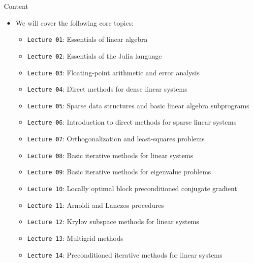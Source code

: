\documentclass[t,usepdftitle=false]{beamer}
\begin{document}
\begin{frame}{Content}
\begin{itemize}
\vspace{-.1cm}
\item We will cover the following core topics:%
\begin{itemize}
\item[-] \texttt{Lecture 01}: Essentials of linear algebra\vspace{.02cm}
\item[-] \texttt{Lecture 02}: Essentials of the Julia language\vspace{.02cm}
\item[-] \texttt{Lecture 03}: Floating-point arithmetic and error analysis\vspace{.02cm}
\item[-] \texttt{Lecture 04}: Direct methods for dense linear systems\vspace{.02cm}
\item[-] \texttt{Lecture 05}: Sparse data structures and basic linear algebra subprograms\vspace{.02cm}
\item[-] \texttt{Lecture 06}: Introduction to direct methods for sparse linear systems\vspace{.02cm}
\item[-] \texttt{Lecture 07}: Orthogonalization and least-squares problems\vspace{.02cm}
\item[-] \texttt{Lecture 08}: Basic iterative methods for linear systems\vspace{.02cm}
\item[-] \texttt{Lecture 09}: Basic iterative methods for eigenvalue problems\vspace{.02cm}
\item[-] \texttt{Lecture 10}: Locally optimal block preconditioned conjugate gradient\vspace{.02cm}
\item[-] \texttt{Lecture 11}: Arnoldi and Lanczos procedures\vspace{.02cm}
\item[-] \texttt{Lecture 12}: Krylov subspace methods for linear systems\vspace{.02cm}
\item[-] \texttt{Lecture 13}: Multigrid methods\vspace{.02cm}
\item[-] \texttt{Lecture 14}: Preconditioned iterative methods for linear systems\vspace{.02cm}

\end{itemize}
\end{itemize}
\end{frame}
\end{document}
